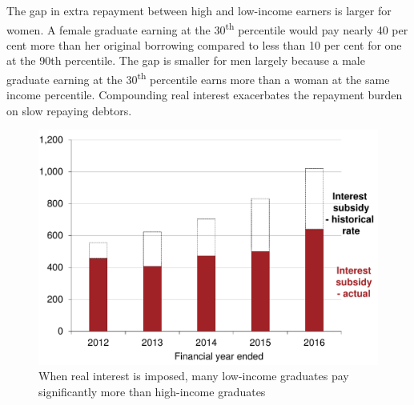 \documentclass[embargoed]{grattan}
\begin{document}
The gap in extra repayment between high and low-income earners is larger for women.
A female graduate earning at the 30\textsuperscript{th} percentile would pay nearly 40 per cent more than her original borrowing compared to less than 10 per cent for one at the 90th percentile.
The gap is smaller for men largely because a male graduate earning at the 30\textsuperscript{th} percentile earns more than a woman at the same income percentile.
Compounding real interest exacerbates the repayment burden on slow repaying debtors.


\begin{figure}
\caption{When real interest is imposed, many low-income graduates pay significantly more than high-income graduates}\label{fig:fig14-when-real-interest-imposed-many-low-income-grads-pay-signif-more-than-high-income-grads}


\includegraphics[page=14]{atlas/Chartpack.pdf}

%
\end{figure}
\end{document}
